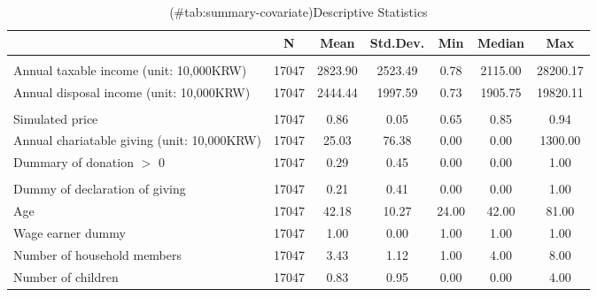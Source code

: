 \begin{table}

\caption{(\#tab:summary-covariate)Descriptive Statistics}
\centering
\fontsize{8}{10}\selectfont
\begin{threeparttable}
\begin{tabular}[t]{lcccccc}
\toprule
  & N & Mean & Std.Dev. & Min & Median & Max\\
\midrule
\addlinespace[0.3em]
\multicolumn{7}{l}{\textit{Income and giving price}}\\
\hspace{1em}Annual taxable income (unit: 10,000KRW) & 17047 & \num{2823.90} & \num{2523.49} & \num{0.78} & \num{2115.00} & \num{28200.17}\\
\hspace{1em}Annual disposal income (unit: 10,000KRW) & 17047 & \num{2444.44} & \num{1997.59} & \num{0.73} & \num{1905.75} & \num{19820.11}\\
\addlinespace[0.3em]
\multicolumn{7}{l}{\textit{Charitable giving}}\\
\hspace{1em}Simulated price & 17047 & \num{0.86} & \num{0.05} & \num{0.65} & \num{0.85} & \num{0.94}\\
\hspace{1em}Annual chariatable giving (unit: 10,000KRW) & 17047 & \num{25.03} & \num{76.38} & \num{0.00} & \num{0.00} & \num{1300.00}\\
\hspace{1em}Dummary of donation $>$ 0 & 17047 & \num{0.29} & \num{0.45} & \num{0.00} & \num{0.00} & \num{1.00}\\
\addlinespace[0.3em]
\multicolumn{7}{l}{\textit{Demographics}}\\
\hspace{1em}Dummy of declaration of giving & 17047 & \num{0.21} & \num{0.41} & \num{0.00} & \num{0.00} & \num{1.00}\\
\hspace{1em}Age & 17047 & \num{42.18} & \num{10.27} & \num{24.00} & \num{42.00} & \num{81.00}\\
\hspace{1em}Wage earner dummy & 17047 & \num{1.00} & \num{0.00} & \num{1.00} & \num{1.00} & \num{1.00}\\
\hspace{1em}Number of household members & 17047 & \num{3.43} & \num{1.12} & \num{1.00} & \num{4.00} & \num{8.00}\\
\hspace{1em}Number of children & 17047 & \num{0.83} & \num{0.95} & \num{0.00} & \num{0.00} & \num{4.00}\\

\end{tabular}
\end{threeparttable}
\end{table}
